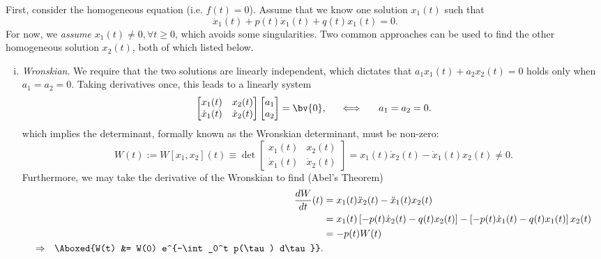 First, consider the homogeneous equation (i.e. $f(t) = 0$). 
Assume that we know one solution $x_1(t)$ such that 
\begin{equation}
    \ddot{x}_1(t) + p(t) \dot{x}_1(t) + q(t) x_1(t) = 0.
\end{equation}
For now, we \emph{assume $x_1(t) \neq 0, \forall t \geq 0$}, which avoids some singularities. 
Two common approaches can be used to find the other homogeneous solution $x_2(t)$, both of which listed below. 
\begin{enumerate}[(i)]
\item {
    \emph{Wronskian}. We require that the two solutions are linearly independent, which dictates that $a_1 x_1(t) + a_2 x_2(t) = 0$ holds only when $a_1 = a_2 = 0$. 
    Taking derivatives once, this leads to a linearly system 
    \begin{equation}
        \begin{bmatrix}
            x_1(t) & x_2(t) \\
            \dot{x}_1(t) & \dot{x}_2(t)
        \end{bmatrix} \begin{bmatrix}
            a_1 \\ a_2
        \end{bmatrix} = \bv{0}, ~~~~ \iff ~~~~ a_1 = a_2 = 0.
    \end{equation}
    which implies the determinant, formally known as the Wronskian determinant, must be non-zero:
    \begin{equation}
        W(t) := W[x_1, x_2](t) \equiv \det \begin{bmatrix}
            x_1(t) & x_2(t) \\
            \dot{x}_1(t) & \dot{x}_2(t)
        \end{bmatrix} = x_1(t) \dot{x}_2(t) - \dot{x}_1(t) x_2(t) \neq 0.
    \end{equation}
    Furthermore, we may take the derivative of the Wronskian to find (Abel's Theorem)
    \begin{equation}
    \begin{aligned}
        \frac{dW}{dt}(t) &= x_1(t) \ddot{x}_2(t) - \ddot{x}_1(t) x_2(t) \\
        &= x_1(t) \left[-p(t) \dot{x}_2(t) - q(t) x_2(t) \right] - \left[-p(t) \dot{x}_1(t) - q(t) x_1(t) \right]x_2(t) \\
        &= -p(t) W(t) \\
        \Rightarrow ~~ \Aboxed{W(t) &= W(0) e^{-\int_0^t p(\tau) d\tau}}.
    \end{aligned}

\end{equation}}
\end{enumerate}
